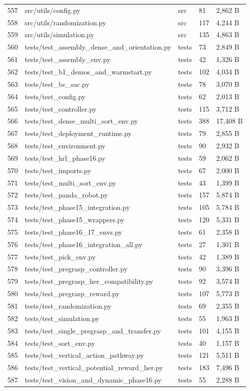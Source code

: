 \documentclass[11pt,a4paper,oneside]{book}
\begin{document}
\begin{longtable}{l l l l l}
557 & src/utils/config.py & src & 81 & 2,862 B \\
558 & src/utils/randomization.py & src & 117 & 4,244 B \\
559 & src/utils/simulation.py & src & 135 & 4,863 B \\
560 & tests/test\_assembly\_dense\_and\_orientation.py & tests & 73 & 2,849 B \\
561 & tests/test\_assembly\_env.py & tests & 42 & 1,326 B \\
562 & tests/test\_b1\_demos\_and\_warmstart.py & tests & 102 & 4,034 B \\
563 & tests/test\_bc\_sac.py & tests & 78 & 3,070 B \\
564 & tests/test\_config.py & tests & 62 & 2,013 B \\
565 & tests/test\_controller.py & tests & 115 & 3,712 B \\
566 & tests/test\_dense\_multi\_sort\_env.py & tests & 388 & 17,408 B \\
567 & tests/test\_deployment\_runtime.py & tests & 79 & 2,855 B \\
568 & tests/test\_environment.py & tests & 90 & 2,932 B \\
569 & tests/test\_hrl\_phase16.py & tests & 59 & 2,062 B \\
570 & tests/test\_imports.py & tests & 67 & 2,000 B \\
571 & tests/test\_multi\_sort\_env.py & tests & 43 & 1,399 B \\
572 & tests/test\_panda\_robot.py & tests & 157 & 5,874 B \\
573 & tests/test\_phase15\_integration.py & tests & 105 & 5,784 B \\
574 & tests/test\_phase15\_wrappers.py & tests & 120 & 5,331 B \\
575 & tests/test\_phase16\_17\_envs.py & tests & 61 & 2,358 B \\
576 & tests/test\_phase16\_integration\_all.py & tests & 27 & 1,301 B \\
577 & tests/test\_pick\_env.py & tests & 42 & 1,389 B \\
578 & tests/test\_pregrasp\_controller.py & tests & 90 & 3,396 B \\
579 & tests/test\_pregrasp\_her\_compatibility.py & tests & 92 & 3,574 B \\
580 & tests/test\_pregrasp\_reward.py & tests & 107 & 5,773 B \\
581 & tests/test\_randomization.py & tests & 69 & 2,355 B \\
582 & tests/test\_simulation.py & tests & 55 & 1,963 B \\
583 & tests/test\_single\_pregrasp\_and\_transfer.py & tests & 101 & 4,155 B \\
584 & tests/test\_sort\_env.py & tests & 40 & 1,157 B \\
585 & tests/test\_vertical\_action\_pathway.py & tests & 121 & 5,511 B \\
586 & tests/test\_vertical\_potential\_reward\_her.py & tests & 183 & 7,496 B \\
587 & tests/test\_vision\_and\_dynamic\_phase16.py & tests & 55 & 2,288 B \\
\bottomrule \end{longtable}
\end{document}
